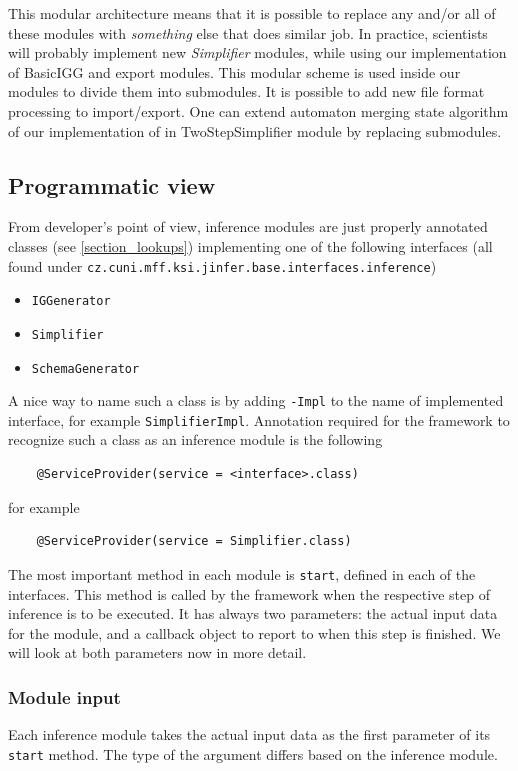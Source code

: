 \documentclass[a4paper,10pt,oneside]{article}
\newcommand{\code}[1]{\texttt{#1}}
\newcommand{\jmodule}[1]{\emph{#1}}
\begin{document}
This modular architecture means that it is possible to replace any and/or all of these modules with \emph{something} else that does similar job. In practice, scientists will probably implement new \jmodule{Simplifier} modules, while using our implementation of BasicIGG and export modules. This modular scheme is used inside our modules to divide them into submodules. It is possible to add new file format processing to import/export. One can extend automaton merging state algorithm of our implementation of \cite{ahonen} in TwoStepSimplifier module by replacing submodules.

\subsection{Programmatic view}
From developer's point of view, inference modules are just properly annotated classes (see \ref{section_lookups}) implementing one of the following interfaces (all found under \code{cz.cuni.mff.ksi.jinfer.base.interfaces.inference})
\begin{itemize}
	\item \code{IGGenerator}
	\item \code{Simplifier}
	\item \code{SchemaGenerator}
\end{itemize}
A nice way to name such a class is by adding \code{-Impl} to the name of implemented interface, for example \code{SimplifierImpl}.
Annotation required for the framework to recognize such a class as an inference module is the following
\begin{verbatim}
	@ServiceProvider(service = <interface>.class)
\end{verbatim}
for example
\begin{verbatim}
	@ServiceProvider(service = Simplifier.class)
\end{verbatim}
The most important method in each module is \code{start}, defined in each of the interfaces. This method is called by the framework when the respective step of inference is to be executed. It has always two parameters: the actual input data for the module, and a callback object to report to when this step is finished. We will look at both parameters now in more detail. 

\subsubsection{Module input}
Each inference module takes the actual input data as the first parameter of its \code{start} method. The type of the argument differs based on the inference module.
\end{document}
